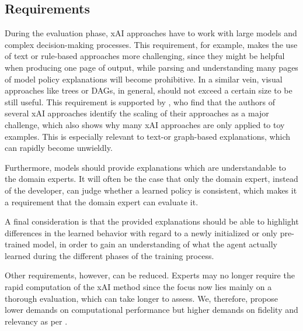 \documentclass[twoside,11pt]{article}
\begin{document}

\subsection{Requirements}
During the evaluation phase, xAI approaches have to work with large models and complex decision-making processes. This requirement, for example, makes the use of text or rule-based approaches \citep{TabrezHayes:2019:xRLTextualExplanations,HayesShah:2017:AutonomousPolicyExplanation} more challenging, since they might be helpful when producing one page of output, while parsing and understanding many pages of model policy explanations will become prohibitive. In a similar vein, visual approaches like trees or DAGs, in general, should not exceed a certain size to be still useful. 
This requirement is supported by \citet{WellsBednarz:2021:xAIRLSurvey}, who find that the authors of several xAI approaches identify the scaling of their approaches as a major challenge, which also shows why many xAI approaches are only applied to toy examples. This is especially relevant to text-or graph-based explanations, which can rapidly become unwieldly.

Furthermore, models should provide explanations which are understandable to the domain experts. It will often be the case that only the domain expert, instead of the developer, can judge whether a learned policy is consistent, which makes it a requirement that the domain expert can evaluate it.

A final consideration is that the provided explanations should be able to highlight differences in the learned behavior with regard to a newly initialized or only pre-trained model, in order to gain an understanding of what the agent actually learned during the different phases of the training process.

Other requirements, however, can be reduced. Experts may no longer require the rapid computation of the xAI method since the focus now lies mainly on a thorough evaluation, which can take longer to assess. We, therefore, propose lower demands on computational performance but higher demands on fidelity and relevancy as per \citet{milani2022survey}.
\end{document}
